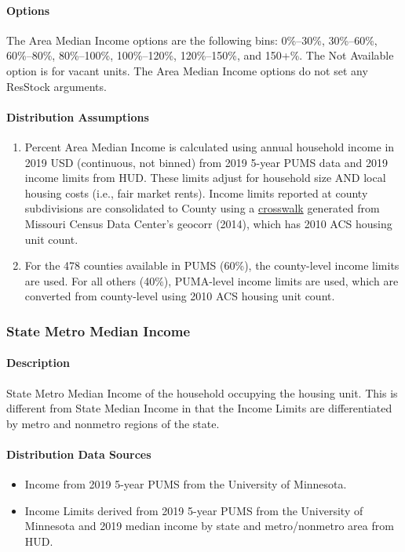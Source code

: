 \paragraph{Options}
The Area Median Income options are the following bins: 0\%--30\%, 30\%--60\%, 60\%--80\%, 80\%--100\%, 100\%--120\%, 120\%--150\%, and 150+\%. The Not Available option is for vacant units. The Area Median Income options do not set any ResStock arguments.

\paragraph{Distribution Assumptions}
\begin{enumerate}
\item
    Percent Area Median Income is calculated using annual household income in
  2019 USD (continuous, not binned) from 2019 5-year PUMS data and 2019
  income limits from HUD. These limits adjust for household size AND
  local housing costs (i.e., fair market rents). Income limits reported at
  county subdivisions are consolidated to County using a \href{https://mcdc.missouri.edu/applications/geocorr2014.html}{crosswalk}
  generated from Missouri Census Data Center's geocorr
  (2014), which has 2010 ACS housing unit count.
\item 
    For the 478 counties
    available in PUMS (60\%), the county-level income limits are used. For
    all others (40\%), PUMA-level income limits are used, which are
    converted from county-level using 2010 ACS housing unit count.
\end{enumerate}

\subsubsection{State Metro Median Income}\label{state_metro_median_income}
\paragraph{Description}
State Metro Median Income of the household occupying the housing unit.
This is different from State Median Income in that the Income Limits are
differentiated by metro and nonmetro regions of the state.

\paragraph{Distribution Data Sources}
\begin{itemize}
\item
  Income from 2019 5-year PUMS from the University of Minnesota.
\item
  Income Limits derived from 2019 5-year PUMS from the University of Minnesota and 2019 median income by state and metro/nonmetro area from HUD.
\end{itemize}

